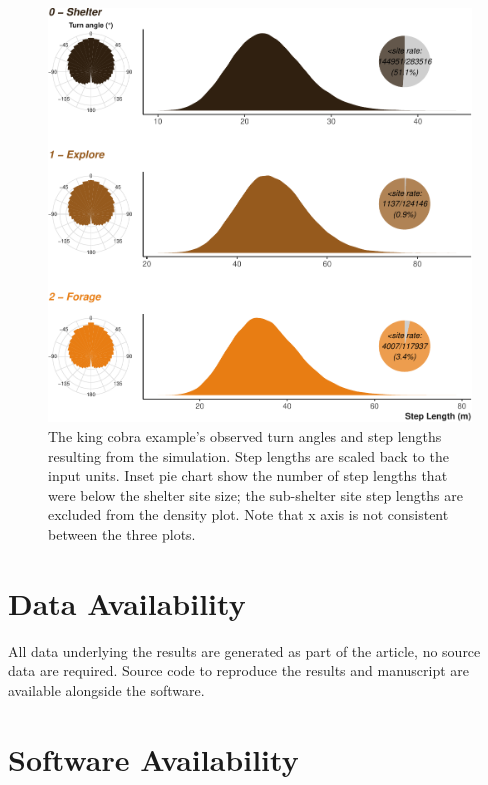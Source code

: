 \documentclass[10pt,a4paper]{article}
\begin{document}
\begin{figure}

{\centering \includegraphics{Agent-based_model_walkthrough_files/figure-latex/KINGCOBRAmoveCharFigure-1} 

}

\caption{The king cobra example's observed turn angles and step lengths resulting from the simulation. Step lengths are scaled back to the input units. Inset pie chart show the number of step lengths that were below the shelter site size; the sub-shelter site step lengths are excluded from the density plot. Note that x axis is not consistent between the three plots.}\label{fig:KINGCOBRAmoveCharFigure}
\end{figure}

\hypertarget{data-availability}{%
\section{Data Availability}\label{data-availability}}

All data underlying the results are generated as part of the article, no source data are required.
Source code to reproduce the results and manuscript are available alongside the software.

\hypertarget{software-availability}{%
\section{Software Availability}\label{software-availability}}
\end{document}
